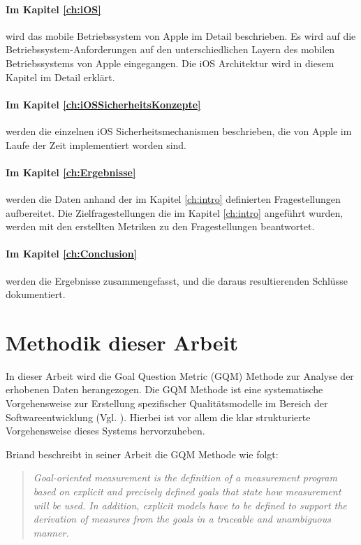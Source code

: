 \paragraph{Im Kapitel \ref{ch:iOS}} wird das mobile Betriebssystem von Apple im Detail beschrieben. Es wird auf die Betriebssystem-Anforderungen auf den unterschiedlichen Layern des mobilen Betriebssystems von Apple eingegangen. Die iOS Architektur wird in diesem Kapitel im Detail erklärt. 

\paragraph{Im Kapitel \ref{ch:iOSSicherheitsKonzepte}} werden die einzelnen iOS Sicherheitsmechanismen beschrieben, die von Apple im Laufe der Zeit implementiert worden sind.

\paragraph{Im Kapitel \ref{ch:Ergebnisse}} werden die Daten anhand der im Kapitel \ref{ch:intro} definierten Fragestellungen aufbereitet. Die Zielfragestellungen die im Kapitel \ref{ch:intro} angeführt wurden, werden mit den erstellten Metriken zu den Fragestellungen beantwortet.

\paragraph{Im Kapitel \ref{ch:Conclusion}} werden die Ergebnisse zusammengefasst, und die daraus resultierenden Schlüsse dokumentiert.

\section{Methodik dieser Arbeit}
\label{sec:MethArbeit}
In dieser Arbeit wird die Goal Question Metric (GQM) Methode zur Analyse der erhobenen Daten herangezogen. Die GQM Methode ist eine systematische Vorgehensweise zur Erstellung spezifischer Qualitätsmodelle im Bereich der Softwareentwicklung (Vgl. \cite{GQM[1], GQM[2]}).  Hierbei ist vor allem die klar strukturierte Vorgehensweise dieses Systems hervorzuheben.\par

Briand beschreibt in seiner Arbeit die GQM Methode wie folgt: 
\begin{quote}
\textit{\glqq Goal-oriented measurement is the definition of a measurement program based on explicit and precisely defined goals that state how measurement will be used. In addition, explicit models have to be defined to support the derivation of measures from the goals in a traceable and unambiguous manner.\grqq{}} \cite{GQM[5]} 
\end{quote}

